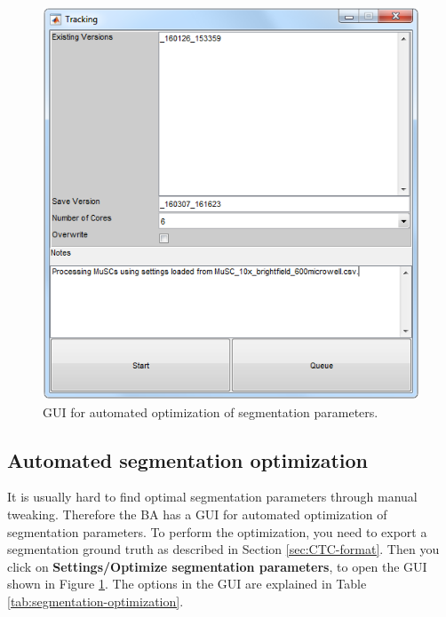 \documentclass[a4paper, oneside, onecolumn, 11pt]{article}
\newcommand{\menu}[1]{\textbf{#1}}
\begin{document}
\begin{figure}[!htb]
\begin{center}
\includegraphics[width = 0.5\columnwidth]{figures/trackingGUI}
\caption{GUI for automated optimization of segmentation parameters.}
\label{fig:segmentation-optimization-GUI}
\end{center}
\end{figure}

\subsection{Automated segmentation optimization}
It is usually hard to find optimal segmentation parameters through manual tweaking. Therefore the BA has a GUI for automated optimization of segmentation parameters. To perform the optimization, you need to export a segmentation ground truth as described in Section \ref{sec:CTC-format}. Then you click on \menu{Settings/Optimize segmentation parameters}, to open the GUI shown in Figure \ref{fig:segmentation-optimization-GUI}. The options in the GUI are explained in Table \ref{tab:segmentation-optimization}.
\end{document}
